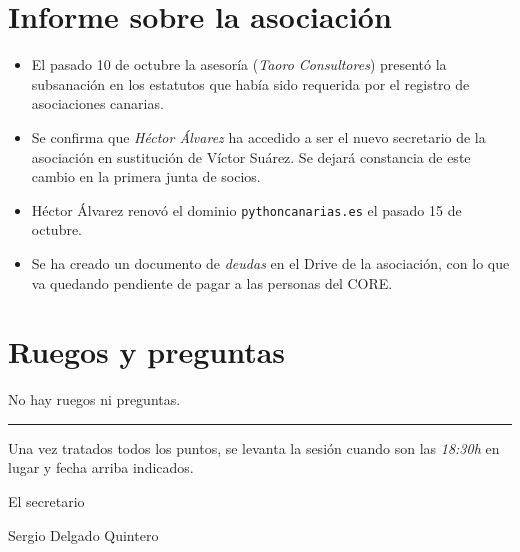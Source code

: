 \documentclass[a4paper, 12pt]{article}
\begin{document}
\section{Informe sobre la asociación}

\begin{itemize}
    \item El pasado 10 de octubre la asesoría (\textit{Taoro Consultores}) presentó la subsanación en los estatutos que había sido requerida por el registro de asociaciones canarias.
    \item Se confirma que \textit{Héctor Álvarez} ha accedido a ser el nuevo secretario de la asociación en sustitución de Víctor Suárez. Se dejará constancia de este cambio en la primera junta de socios.
    \item Héctor Álvarez renovó el dominio \texttt{pythoncanarias.es} el pasado 15 de octubre.
    \item Se ha creado un documento de \textit{deudas} en el Drive de la asociación, con lo que va quedando pendiente de pagar a las personas del CORE.
\end{itemize}

\section{Ruegos y preguntas}

No hay ruegos ni preguntas.


\vspace{1cm}
\hrule
\vspace{3mm}

Una vez tratados todos los puntos, se levanta la sesión cuando son las \textit{18:30h} en lugar y fecha arriba indicados.

\begin{flushright}
El secretario

Sergio Delgado Quintero
\end{flushright}
\end{document}
